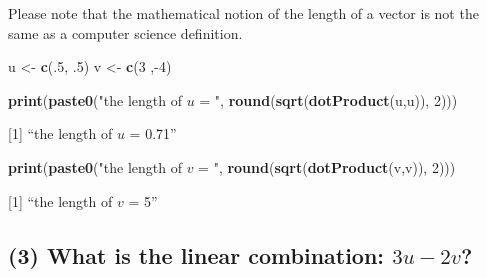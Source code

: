 \documentclass[]{article}
\newenvironment{Shaded}{\begin{snugshade}}{\end{snugshade}}
\newcommand{\KeywordTok}[1]{\textcolor[rgb]{0.13,0.29,0.53}{\textbf{{#1}}}}
\newcommand{\DecValTok}[1]{\textcolor[rgb]{0.00,0.00,0.81}{{#1}}}
\newcommand{\StringTok}[1]{\textcolor[rgb]{0.31,0.60,0.02}{{#1}}}
\newcommand{\NormalTok}[1]{{#1}}
\begin{document}
Please note that the mathematical notion of the length of a vector is
not the same as a computer science definition.

\begin{Shaded}
\begin{Highlighting}[]
\NormalTok{u <-}\StringTok{  }\KeywordTok{c}\NormalTok{(.}\DecValTok{5}\NormalTok{, .}\DecValTok{5}\NormalTok{)}
\NormalTok{v <-}\StringTok{  }\KeywordTok{c}\NormalTok{(}\DecValTok{3} \NormalTok{,-}\DecValTok{4}\NormalTok{)}

\KeywordTok{print}\NormalTok{(}\KeywordTok{paste0}\NormalTok{(}\StringTok{"the length of $u$ = "}\NormalTok{, }\KeywordTok{round}\NormalTok{(}\KeywordTok{sqrt}\NormalTok{(}\KeywordTok{dotProduct}\NormalTok{(u,u)), }\DecValTok{2}\NormalTok{)))}
\end{Highlighting}
\end{Shaded}

{[}1{]} ``the length of \(u\) = 0.71''

\begin{Shaded}
\begin{Highlighting}[]
\KeywordTok{print}\NormalTok{(}\KeywordTok{paste0}\NormalTok{(}\StringTok{"the length of $v$ = "}\NormalTok{, }\KeywordTok{round}\NormalTok{(}\KeywordTok{sqrt}\NormalTok{(}\KeywordTok{dotProduct}\NormalTok{(v,v)), }\DecValTok{2}\NormalTok{)))}
\end{Highlighting}
\end{Shaded}

{[}1{]} ``the length of \(v\) = 5''

\subsection{\texorpdfstring{(3) What is the linear combination:
\(3u - 2v\)?}{(3) What is the linear combination: 3u - 2v?}}\label{what-is-the-linear-combination-3u---2v}
\end{document}
